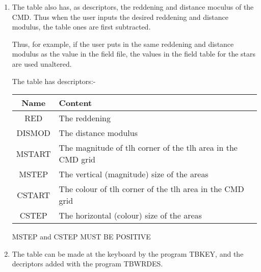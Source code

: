 {{{\begin{enumerate}
\item The table also has, as descriptors, the reddening and distance moculus
      of the CMD. Thus when the user inputs the desired reddening and
      distance modulus, the table ones are first subtracted.
                                                                               
      Thus, for example, if the user puts in the same reddening and distance
      modulus as the value in the field file, the values in the field
      table for the stars are used unaltered.
                                                                               
      The table has descriptors:-
      
\begin{tabular}{|c|p{4.0in}|}\hline
      Name   &  Content \\ \hline
      RED    &  The reddening \\
      DISMOD &  The distance modulus \\
      MSTART &  The magnitude of tlh corner of the tlh area in the CMD grid \\
      MSTEP  &  The vertical (magnitude) size of the areas \\
      CSTART &  The colour of tlh corner of the tlh area in the CMD grid \\
      CSTEP  &  The horizontal (colour) size of the areas \\ \hline
\end{tabular}
                                                                  
      MSTEP and CSTEP MUST BE POSITIVE
                                                                               
\item The table can be made at the keyboard by the program TBKEY, and the
      decriptors added with the program TBWRDES.
                
\end{enumerate}                                                               
                                                                               
                                                                               
}}}
